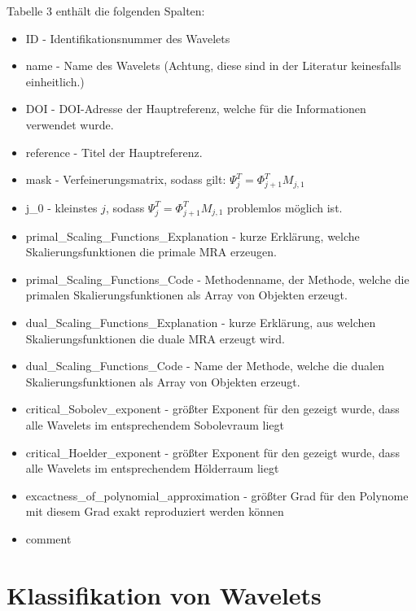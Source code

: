 \documentclass[11pt,a4paper,titlepage]{article}
\theoremstyle{plain} %
\theoremstyle{definition} %
\numberwithin{equation}{section} %
\begin{document}
	Tabelle 3 enthält die folgenden Spalten:
			\begin{itemize}
				\item ID - Identifikationsnummer des Wavelets
				\item name - Name des Wavelets (Achtung, diese sind in der Literatur keinesfalls einheitlich.)
				\item DOI - DOI-Adresse der Hauptreferenz, welche für die Informationen verwendet wurde.
				\item reference - Titel der Hauptreferenz.
				\item mask - Verfeinerungsmatrix, sodass gilt: $\Psi_j^T=\Phi_{j+1}^T M_{j,1}$
				\item j\_0 - kleinstes $j$, sodass $\Psi_j^T=\Phi_{j+1}^T M_{j,1}$ problemlos möglich ist.
				\item primal\_Scaling\_Functions\_Explanation - kurze Erklärung, welche Skalierungsfunktionen die primale MRA erzeugen.
				\item primal\_Scaling\_Functions\_Code - Methodenname, der Methode, welche die primalen Skalierungsfunktionen als Array von Objekten erzeugt.
				\item dual\_Scaling\_Functions\_Explanation - kurze Erklärung, aus welchen Skalierungsfunktionen die duale MRA erzeugt wird.
				\item dual\_Scaling\_Functions\_Code - Name der Methode, welche die dualen Skalierungsfunktionen als Array von Objekten erzeugt.
				\item critical\_Sobolev\_exponent - größter Exponent für den gezeigt wurde, dass alle Wavelets im entsprechendem Sobolevraum liegt
				\item critical\_Hoelder\_exponent - größter Exponent für den gezeigt wurde, dass alle Wavelets im entsprechendem Hölderraum liegt
				\item excactness\_of\_polynomial\_approximation - größter Grad für den Polynome mit diesem Grad exakt reproduziert werden können
				\item comment
			\end{itemize}
	
	\newpage
	\section{Klassifikation von Wavelets}
\end{document}
